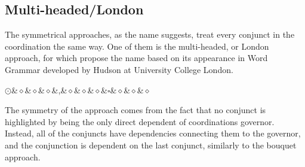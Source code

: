 \subsection{Multi-headed/London}
The symmetrical approaches, as the name suggests, treat every conjunct in the coordination the same way. One of them is the multi-headed, or London approach, for which \cite{prz:woz:23} propose the name based on its appearance in Word Grammar developed by Hudson \cite{hudson-2010} at University College London.

\begin{Center}
\begin{dependency}[theme = simple]
            \begin{deptext}
    $\odot$\&$\diamond$\&$\diamond$\&$\diamond$\&,\&$\diamond$\&$\diamond$\&$\diamond$\&$\square$\&$\diamond$\&$\diamond$\&$\diamond$\\
            \end{deptext}
        \end{dependency}
\end{Center}

The symmetry of the approach comes from the fact that no conjunct is highlighted by being the only direct dependent of coordinations governor. Instead, all of the conjuncts have dependencies connecting them to the governor, and the conjunction is dependent on the last conjunct, similarly to the bouquet approach.

